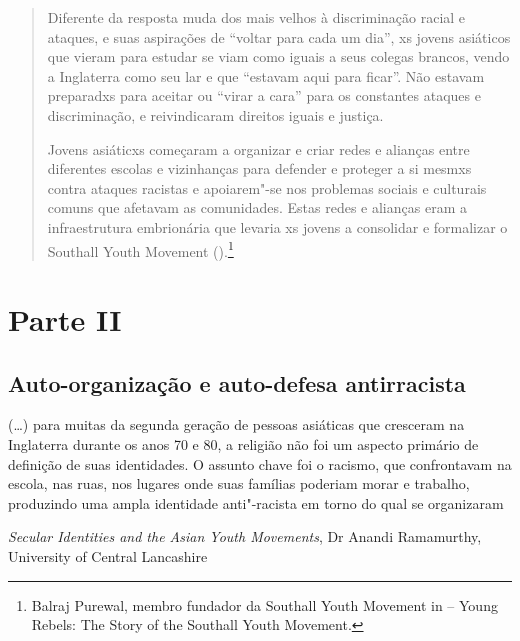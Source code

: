 \begin{quote}
Diferente da resposta muda dos mais velhos à discriminação racial e ataques, e suas aspirações de ``voltar para cada um dia'', xs jovens asiáticos que vieram para estudar se viam como iguais a seus colegas brancos, vendo a Inglaterra como seu lar e que ``estavam aqui para ficar''. Não estavam preparadxs para aceitar ou ``virar a cara'' para os constantes ataques e discriminação, e reivindicaram direitos iguais e justiça.

Jovens asiáticxs começaram a organizar e criar redes e alianças entre diferentes escolas e vizinhanças para defender e proteger a si mesmxs contra ataques racistas e apoiarem"-se nos problemas sociais e culturais comuns que afetavam as comunidades. Estas redes e alianças eram a infraestrutura embrionária que levaria xs jovens a consolidar e formalizar o Southall Youth Movement ().\footnote{Balraj Purewal, membro fundador da Southall Youth Movement in  -- Young Rebels: The Story of the Southall Youth Movement.}
\end{quote}



\section{Parte II}

\subsection{Auto-organização e auto-defesa antirracista}

\epigraph{(\ldots{}) para muitas da segunda geração de pessoas asiáticas que cresceram na Inglaterra durante os anos 70 e 80, a religião não foi um aspecto primário de definição de suas identidades. O assunto chave foi o racismo, que confrontavam na escola, nas ruas, nos lugares onde suas famílias poderiam morar e trabalho, produzindo uma ampla identidade anti"-racista em torno do qual se organizaram}{\textit{Secular Identities and the Asian Youth Movements}, Dr Anandi Ramamurthy, University of Central Lancashire}


